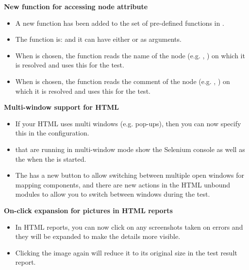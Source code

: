 \textbf{New function for accessing node attribute}
\begin{itemize}
\item A new function has been added to the set of pre-defined functions in \app{}.
\item The function is:  and it can have either  or  as arguments.
\item When  is chosen, the function reads the name of the node (e.g. \gdcase{}, \gdstep{}) on which it is resolved and uses this for the test.
\item  When  is chosen, the function reads the comment of the node (e.g. \gdcase{}, \gdstep{}) on which it is resolved and uses this for the test.
\end{itemize}

\textbf{Multi-window support for HTML \gdauts{}}
\begin{itemize}
\item If your HTML \gdaut{} uses multi windows (e.g. pop-ups), then you can now specify this in the \gdaut{} configuration. 
\item \gdauts{} that are running in multi-window mode show the Selenium console as well as the \gdaut{} when the \gdaut{} is started. 
\item The \gdomeditor{} has a new button to allow switching between multiple open windows for mapping components, and there are new actions in the HTML unbound modules to allow you to switch between windows during the test. 
\end{itemize}

\textbf{On-click expansion for pictures in HTML reports}
\begin{itemize}
\item In HTML reports, you can now click on any screenshots taken on errors and they will be expanded to make the details more visible.
\item Clicking the image again will reduce it to its original size in the test result report.
\end{itemize}
